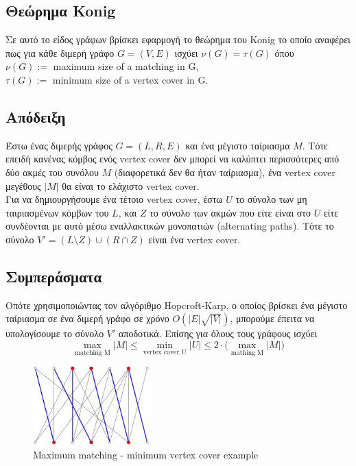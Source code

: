 \subsection{Θεώρημα Konig}

Σε αυτό το είδος γράφων βρίσκει εφαρμογή το θεώρημα του Konig το οποίο αναφέρει πως για κάθε διμερή γράφο $G=(V,E)$ ισχύει $\nu(G) = \tau(G)$ όπου\\
$\nu(G) := $ maximum size of a matching in G,\\
$\tau(G) := $ minimum size of a vertex cover in G.

\subsection{Απόδειξη}
\justify
Έστω ένας διμερής γράφος $G = (L, R, E)$ και ένα μέγιστο ταίριασμα $M$. Τότε επειδή κανένας κόμβος ενός vertex cover δεν μπορεί να καλύπτει περισσότερες από δύο ακμές του συνόλου $M$ (διαφορετικά δεν θα ήταν ταίριασμα), ένα vertex cover μεγέθους $|M|$ θα είναι το ελάχιστο vertex cover.\\
Για να δημιουργήσουμε ένα τέτοιο vertex cover, έστω $U$ το σύνολο των μη ταιριασμένων κόμβων του $L$, και $Z$ το σύνολο των ακμών που είτε είναι στο $U$ είτε συνδέονται με αυτό μέσω εναλλακτικών μονοπατιών (alternating paths). Τότε το σύνολο $V' = (L \setminus Z) \cup (R \cap Z)$ είναι ένα vertex cover. 

\subsection{Συμπεράσματα}

Οπότε χρησιμοποιώντας τον αλγόριθμο Hopcroft-Karp, ο οποίος βρίσκει ένα μέγιστο ταίριασμα σε ένα διμερή γράφο σε χρόνο $O(|E| \sqrt{|V|})$, μπορούμε έπειτα να υπολογίσουμε το σύνολο $V'$ αποδοτικά.
Επίσης για όλους τους γράφους ισχύει 
$$ \max_{\text{matching M}} |M| \leq  \min_{\text{vertex cover U}} |U| \leq 2 \cdot \Big( \max_{\text{mathing M}} |M|\Big)$$
\begin{figure}[H]
\caption{Maximum matching - minimum vertex cover example}
\centering
\includegraphics[width=0.4\textwidth]{Figures/KonigTheo.png}\centering
\end{figure}

